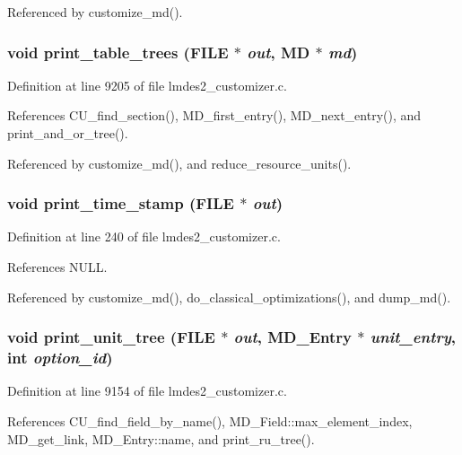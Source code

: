Referenced by customize\_\-md().
\subsubsection{\setlength{\rightskip}{0pt plus 5cm}void print\_\-table\_\-trees (FILE $\ast$ {\em out}, \bf{MD} $\ast$ {\em md})}\label{lmdes2__customizer_8c_a2b1793d18fb89fc6b66c789c85cc39a}




Definition at line 9205 of file lmdes2\_\-customizer.c.

References CU\_\-find\_\-section(), MD\_\-first\_\-entry(), MD\_\-next\_\-entry(), and print\_\-and\_\-or\_\-tree().

Referenced by customize\_\-md(), and reduce\_\-resource\_\-units().
\subsubsection{\setlength{\rightskip}{0pt plus 5cm}void print\_\-time\_\-stamp (FILE $\ast$ {\em out})}\label{lmdes2__customizer_8c_0544d5712b0f4afe9036291b18aab413}




Definition at line 240 of file lmdes2\_\-customizer.c.

References NULL.

Referenced by customize\_\-md(), do\_\-classical\_\-optimizations(), and dump\_\-md().
\subsubsection{\setlength{\rightskip}{0pt plus 5cm}void print\_\-unit\_\-tree (FILE $\ast$ {\em out}, \bf{MD\_\-Entry} $\ast$ {\em unit\_\-entry}, int {\em option\_\-id})}\label{lmdes2__customizer_8c_a8a42d2c311cc844d1ba895443b70aa4}




Definition at line 9154 of file lmdes2\_\-customizer.c.

References CU\_\-find\_\-field\_\-by\_\-name(), MD\_\-Field::max\_\-element\_\-index, MD\_\-get\_\-link, MD\_\-Entry::name, and print\_\-ru\_\-tree().

